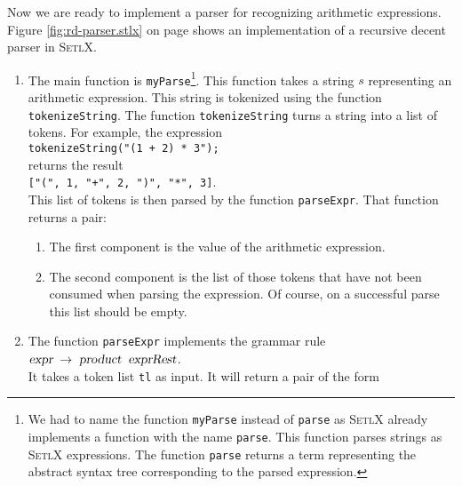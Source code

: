 \noindent
Now we are ready to implement a parser for recognizing arithmetic expressions.
Figure \ref{fig:rd-parser.stlx} on page
\pageref{fig:rd-parser.stlx} shows an implementation of a recursive decent parser in
\textsc{SetlX}. 
\begin{enumerate}
\item The main function is \texttt{myParse}\footnote{
            We had to name the function \texttt{myParse} instead of \texttt{parse} as 
            \textsc{SetlX} already implements a function with the name \texttt{parse}.
            This function parses strings as \textsc{SetlX} expressions.  The function
            \texttt{parse} returns a term representing the abstract syntax tree
            corresponding to the parsed expression.
      }.  This function takes a string $s$
      representing an arithmetic expression.  This string is tokenized using the 
      function \texttt{tokenizeString}.  The function \texttt{tokenizeString} turns a
      string into a list of tokens.  For example, the expression
      \\[0.2cm]
      \hspace*{1.3cm}
      \verb|tokenizeString("(1 + 2) * 3");|
      \\[0.2cm]
      returns the result
      \\[0.2cm]
      \hspace*{1.3cm}
      \verb|["(", 1, "+", 2, ")", "*", 3]|.
      \\[0.2cm]
      This list of tokens is then parsed by the function \texttt{parseExpr}.
      That function returns a pair: 
      \begin{enumerate}
      \item The first  component is the value of the arithmetic expression.
      \item The second component is the list of those tokens that have not been consumed
            when parsing the expression.  Of course, on a successful parse this list
            should be empty.
      \end{enumerate}
\item The function \texttt{parseExpr} implements the grammar rule
      \\[0.2cm]
      \hspace*{1.3cm}
      $\textsl{expr} \;\rightarrow\;\textsl{product}\;\;\textsl{exprRest}$. 
      \\[0.2cm]
      It takes a token list \texttt{tl} as input.  It will return a pair of the form
      \\[0.2cm]

\end{enumerate}
